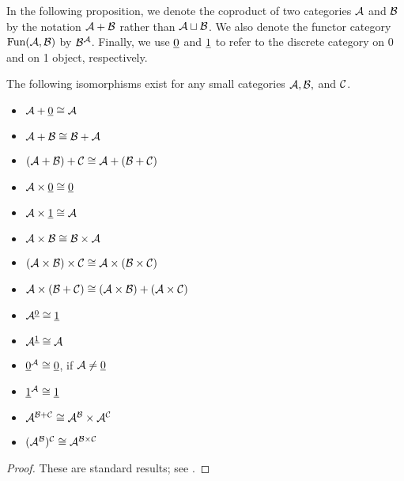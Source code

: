 In the following proposition, we denote the coproduct of two categories $\mathcal{A}$ and $\mathcal{B}$ by the notation $\mathcal{A}+\mathcal{B}$ rather than $\mathcal{A}\sqcup\mathcal{B}$. We also denote the functor category $\textnormal{Fun}(\mathcal{A},\mathcal{B})$ by $\mathcal{B}^\mathcal{A}$. Finally, we use $\underline{0}$ and $\underline{1}$ to refer to the discrete category on 0 and on 1 object, respectively.

\begin{proposition}\label{prop:arithmetic of cats}

The following isomorphisms exist for any small categories $\mathcal{A},\mathcal{B},$ and $\mathcal{C}$.

\begin{itemize}
\item $\mathcal{A}+\underline{0}\cong \mathcal{A}$
\item $\mathcal{A} + \mathcal{B}\cong \mathcal{B} + \mathcal{A}$
\item $(\mathcal{A} + \mathcal{B}) + \mathcal{C} \cong \mathcal{A} + (\mathcal{B} + \mathcal{C})$
\item $\mathcal{A}\times\underline{0}\cong\underline{0}$
\item $\mathcal{A}\times\underline{1}\cong \mathcal{A}$
\item $\mathcal{A}\times \mathcal{B}\cong \mathcal{B}\times \mathcal{A}$
\item $(\mathcal{A}\times\mathcal{B})\times\mathcal{C}\cong\mathcal{A}\times(\mathcal{B}\times\mathcal{C})$
\item $\mathcal{A}\times(\mathcal{B}+\mathcal{C})\cong (\mathcal{A}\times \mathcal{B})+(\mathcal{A}\times \mathcal{C})$
\item $\mathcal{A}^{\underline{0}}\cong \underline{1}$
\item $\mathcal{A}^{\underline{1}}\cong \mathcal{A}$
\item $\underline{0}^\mathcal{A}\cong\underline{0}$,\;\; if $\mathcal{A}\neq\underline{0}$
\item $\underline{1}^\mathcal{A}\cong\underline{1}$
\item $\mathcal{A}^{\mathcal{B}+\mathcal{C}}\cong \mathcal{A}^\mathcal{B}\times \mathcal{A}^\mathcal{C}$
\item $(\mathcal{A}^\mathcal{B})^\mathcal{C}\cong \mathcal{A}^{\mathcal{B}\times \mathcal{C}}$
\end{itemize}

\end{proposition}

\begin{proof}

These are standard results; see \cite{Mac}.

\end{proof}

